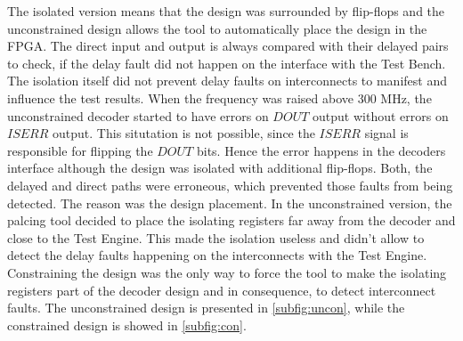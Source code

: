 The isolated version means that the design was surrounded by flip-flops and the unconstrained design allows the tool to automatically place the design in the FPGA. The direct input and output is always compared with their delayed pairs to check, if the delay fault did not happen on the interface with the Test Bench. The isolation itself did not prevent delay faults on interconnects to manifest and influence the test results. When the frequency was raised above 300 MHz, the unconstrained decoder started to have errors on $DOUT$ output without errors on $ISERR$ output. This situtation is not possible, since the $ISERR$ signal is responsible for flipping the $DOUT$ bits. Hence the error happens in the decoders interface although the design was isolated with additional flip-flops. Both, the delayed and direct paths were erroneous, which prevented those faults from being detected. The reason was the design placement. In the unconstrained version, the palcing tool decided to place the isolating registers far away from the decoder and close to the Test Engine. This made the isolation useless and didn't allow to detect the delay faults happening on the interconnects with the Test Engine. Constraining the design was the only way to force the tool to make the isolating registers part of the decoder design and in consequence, to detect interconnect faults. The unconstrained design is presented in \autoref{subfig:uncon}, while the constrained design is showed in \autoref{subfig:con}.

